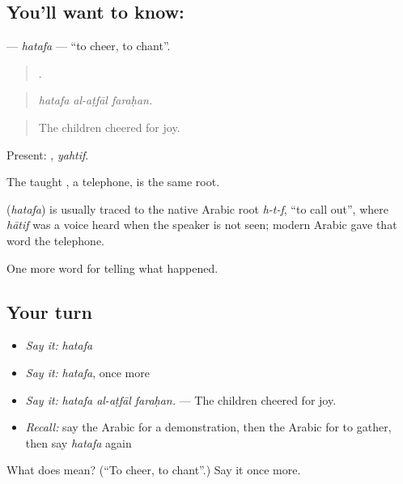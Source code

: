\subsection*{You'll want to know: }
\textbf{} — \emph{hatafa} — \textquotedblleft{}to cheer, to chant\textquotedblright{}.

\begin{quote}
  .
\end{quote}

\begin{quote}
\emph{hatafa al-aṭfāl faraḥan.}
\end{quote}

\begin{quote}
The children cheered for joy.
\end{quote}

Present: , \emph{yahtif}.

The taught , a telephone, is the same root.

\begin{cousinweb}
\textbf{} (\emph{hatafa}) is usually traced to the native Arabic root \emph{h-t-f}, \textquotedblleft{}to call out\textquotedblright{}, where \emph{hātif} was a voice heard when the speaker is not seen; modern Arabic gave that word the telephone.
\end{cousinweb}

\begin{grammarlens}[title={What you've built}]
One more word for telling what happened.
\end{grammarlens}

\subsection*{Your turn}
\begin{itemize}
\raggedright
  \item \emph{Say it:} \emph{hatafa}
  \item \emph{Say it:} \emph{hatafa}, once more
  \item \emph{Say it:} \emph{hatafa al-aṭfāl faraḥan.} — The children cheered for joy.
  \item \emph{Recall:} say the Arabic for a demonstration, then the Arabic for to gather, then say \emph{hatafa} again
\end{itemize}

\begin{tcolorbox}[breakable,colback=teal!4,colframe=teal!35!black,title={Before you move on}]
What does  mean? (\textquotedblleft{}To cheer, to chant\textquotedblright{}.) Say it once more.
\end{tcolorbox}

